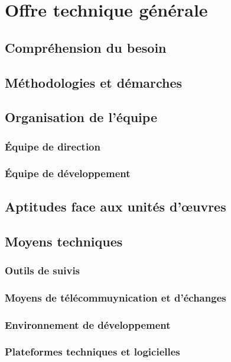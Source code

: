 	\chapter{Offre technique générale}
	\section{Compréhension du besoin}
	\section{Méthodologies et démarches}
	\section{Organisation de l'équipe}
	\subsection{Équipe de direction}
	\subsection{Équipe de développement}
	\section{Aptitudes face aux unités d'œuvres}
	\section{Moyens techniques}
	\subsection{Outils de suivis}
	\subsection{Moyens de télécommuynication et d'échanges}
	\subsection{Environnement de développement}
	\subsection{Plateformes techniques et logicielles}
